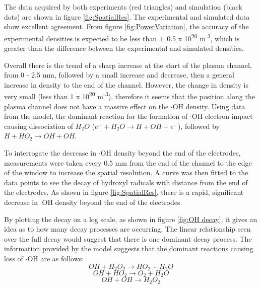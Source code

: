 \documentclass[11pt, oneside]{article}   	%
\begin{document}
The data acquired by both experiments (red triangles) and simulation (black dots) are shown in figure \ref{fig:SpatialRes}.
The experimental and simulated data show excellent agreement.
From figure \ref{fig:PowerVariation}, the accuracy of the experimental densities is expected to be less than $\pm$ 0.5 x 10\textsuperscript{20} m\textsuperscript{-3}, which is greater than the difference between the experimental and simulated densities.

Overall there is the trend of a sharp increase at the start of the plasma channel, from 0 - 2.5 mm, followed by a small increase and decrease, then a general increase in density to the end of the channel. 
However, the change in density is very small (less than 1 x 10\textsuperscript{20} m\textsuperscript{-3}), therefore it seems that the position along the plasma channel does not have a massive effect on the $\cdot$OH density.
Using data from the model, the dominant reaction for the formation of $\cdot$OH electron impact causing dissociation of $H_2O$ ($e^- + H_2O \rightarrow H + OH + e^-$), followed by $H + HO_2 \rightarrow OH + OH$.

To interrogate the decrease in $\cdot$OH density beyond the end of the electrodes, measurements were taken every 0.5 mm from the end of the channel to the edge of the window to increase the spatial resolution.
A curve was then fitted to the data points to see the decay of hydroxyl radicals with distance from the end of the electrodes.
As shown in figure \ref{fig:SpatialRes}, there is a rapid, significant decrease in $\cdot$OH density beyond the end of the electrodes.

By plotting the decay on a log scale, as shown in figure \ref{fig:OH decay}, it gives an idea as to how many decay processes are occurring. The linear relationship seen over the full decay would suggest that there is one dominant decay process. 
The information provided by the model suggests that the dominant reactions causing loss of $\cdot$OH are as follows:
\begin{equation}
OH + H_2O_2 \rightarrow  HO_2 + H_2O
\end{equation}
\begin{equation}
OH +HO_2 \rightarrow O_2 +H_2O
\end{equation}
\begin{equation}
OH + OH \rightarrow H_2O_2
\end{equation}
\end{document}
